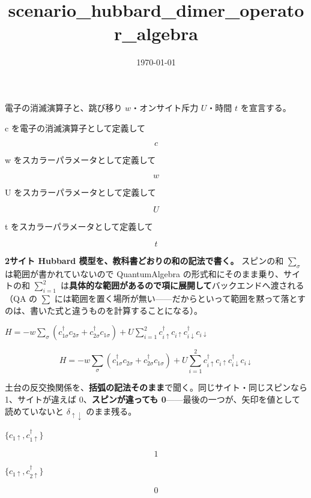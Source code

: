 \documentclass[dvipdfmx,a4paper,11pt]{jsarticle}
\title{scenario\_hubbard\_dimer\_operator\_algebra}
\date{\today}
\begin{document}
\maketitle

電子の消滅演算子と、跳び移り $w$・オンサイト斥力 $U$・時間 $t$ を宣言する。

c を電子の消滅演算子として定義して

\[
  c
\]

w をスカラーパラメータとして定義して

\[
  w
\]

U をスカラーパラメータとして定義して

\[
  U
\]

t をスカラーパラメータとして定義して

\[
  t
\]

\textbf{2サイト Hubbard 模型を、教科書どおりの和の記法で書く。} スピンの和 $\sum_\sigma$ は範囲が書かれていないので QuantumAlgebra の形式和にそのまま乗り、サイトの和 $\sum_{i=1}^{2}$ は\textbf{具体的な範囲があるので項に展開して}バックエンドへ渡される（QA の $\sum$ には範囲を置く場所が無い——だからといって範囲を黙って落とすのは、書いた式と違うものを計算することになる）。

$H = -w \sum_{\sigma} (c^\dagger_{1\sigma} c_{2\sigma} + c^\dagger_{2\sigma} c_{1\sigma}) + U \sum_{i=1}^{2} c^\dagger_{i\uparrow} c_{i\uparrow} c^\dagger_{i\downarrow} c_{i\downarrow}$

\begin{equation}
  H = -w \sum_{\sigma} (c^\dagger_{1\sigma} c_{2\sigma} + c^\dagger_{2\sigma} c_{1\sigma}) + U \sum_{i=1}^{2} c^\dagger_{i\uparrow} c_{i\uparrow} c^\dagger_{i\downarrow} c_{i\downarrow}
  \label{eq:E1}
\end{equation}

土台の反交換関係を、\textbf{括弧の記法そのまま}で聞く。同じサイト・同じスピンなら 1、サイトが違えば 0、\textbf{スピンが違っても 0}——最後の一つが、矢印を値として読めていないと $\delta_{\uparrow\downarrow}$ のまま残る。

$\{c_{1\uparrow}, c^\dagger_{1\uparrow}\}$

\begin{equation}
  1
  \label{eq:E2}
\end{equation}

$\{c_{1\uparrow}, c^\dagger_{2\uparrow}\}$

\begin{equation}
  0
  \label{eq:E3}
\end{equation}
\end{document}
